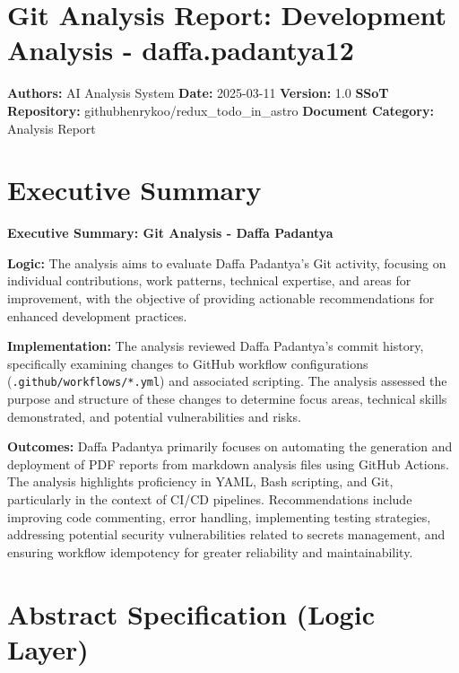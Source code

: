 \documentclass{article}
\begin{document}
\section{Git Analysis Report: Development Analysis - daffa.padantya12}

\textbf{Authors:} AI Analysis System
\textbf{Date:} 2025-03-11
\textbf{Version:} 1.0
\textbf{SSoT Repository:} githubhenrykoo/redux\_todo\_in\_astro
\textbf{Document Category:} Analysis Report
\section*{Executive Summary}
\textbf{Executive Summary: Git Analysis - Daffa Padantya}

\textbf{Logic:} The analysis aims to evaluate Daffa Padantya's Git activity, focusing on individual contributions, work patterns, technical expertise, and areas for improvement, with the objective of providing actionable recommendations for enhanced development practices.

\textbf{Implementation:} The analysis reviewed Daffa Padantya's commit history, specifically examining changes to GitHub workflow configurations (\texttt{.github/workflows/*.yml}) and associated scripting.  The analysis assessed the purpose and structure of these changes to determine focus areas, technical skills demonstrated, and potential vulnerabilities and risks.

\textbf{Outcomes:} Daffa Padantya primarily focuses on automating the generation and deployment of PDF reports from markdown analysis files using GitHub Actions. The analysis highlights proficiency in YAML, Bash scripting, and Git, particularly in the context of CI/CD pipelines. Recommendations include improving code commenting, error handling, implementing testing strategies, addressing potential security vulnerabilities related to secrets management, and ensuring workflow idempotency for greater reliability and maintainability.
\section{Abstract Specification (Logic Layer)}
\end{document}
